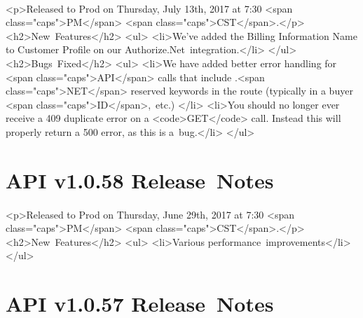 \documentclass{memoir}%
\begin{document}
\paragraph*{}%
<p>Released to Prod on Thursday, July 13th, 2017 at 7:30 <span class="caps">PM</span> <span class="caps">CST</span>.</p>\newline%
<h2>New~Features</h2>\newline%
<ul>\newline%
<li>We’ve added the Billing Information Name to Customer Profile on our Authorize.Net~integration.</li>\newline%
</ul>\newline%
<h2>Bugs~Fixed</h2>\newline%
<ul>\newline%
<li>We have added better error handling for <span class="caps">API</span> calls that include .<span class="caps">NET</span> reserved keywords in the route (typically in a buyer <span class="caps">ID</span>,~etc.) </li>\newline%
<li>You should no longer ever receive a 409 duplicate error on a <code>GET</code> call. Instead this will properly return a 500 error, as this is a~bug.</li>\newline%
</ul>

%
\section*{API v1.0.58 Release~Notes}%
\paragraph*{}%

%
\paragraph*{}%
<p>Released to Prod on Thursday, June 29th, 2017 at 7:30 <span class="caps">PM</span> <span class="caps">CST</span>.</p>\newline%
<h2>New~Features</h2>\newline%
<ul>\newline%
<li>Various performance~improvements</li>\newline%
</ul>

%
\section*{API v1.0.57 Release~Notes}%
\paragraph*{}%
\end{document}
